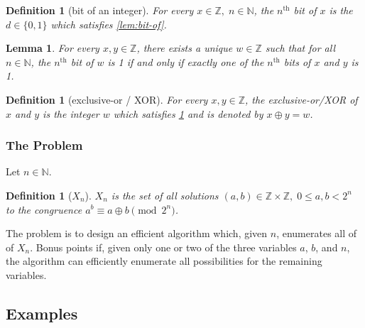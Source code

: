 \documentclass[1gpt]{article}
\theoremstyle{break}
\newtheorem{lemma}[theorem]{Lemma}
\newtheorem{definition}[theorem]{Definition}
\newcommand{\xor}{\oplus}
\begin{document}
\begin{definition}[bit of an integer]
    \label{def:bit-of}
    For every $x \in \mathbb{Z},\; n \in \mathbb{N}$, the $n^\textrm{th}$ bit
    of $x$ is the $d \in \{ 0, 1 \}$ which satisfies \ref{lem:bit-of}.
\end{definition}

\begin{lemma}
    \label{lem:xor}
    For every $x, y \in \mathbb{Z}$, there exists a unique $w \in \mathbb{Z}$
    such that for all $n \in \mathbb{N}$, the $n^\textrm{th}$ bit of $w$ is 1
    if and only if exactly one of the $n^\textrm{th}$ bits of $x$ and $y$ is 1.
\end{lemma}

\begin{definition}[exclusive-or / XOR]
    \label{def:xor}
    For every $x, y \in \mathbb{Z}$, the exclusive-or/XOR of $x$ and $y$ is the
    integer $w$ which satisfies \ref{lem:xor} and is denoted by $x \xor y = w$.
\end{definition}

\subsubsection{The Problem}

Let $n \in \mathbb{N}$.

\begin{definition}[$X_n$]
    \label{def:xn}
    $X_n$ is the set of all solutions $(a, b) \in \mathbb{Z} \times
    \mathbb{Z},\; 0 \leq a,b < 2^n$ to the congruence $a^b \equiv a \xor b
    \pmod{2^n}$.
\end{definition}

The problem is to design an efficient algorithm which, given $n$, enumerates
all of of $X_n$. Bonus points if, given only one or two of the three variables
$a$, $b$, and  $n$, the algorithm can efficiently enumerate all possibilities
for the remaining variables.

\subsection{Examples}
\end{document}

